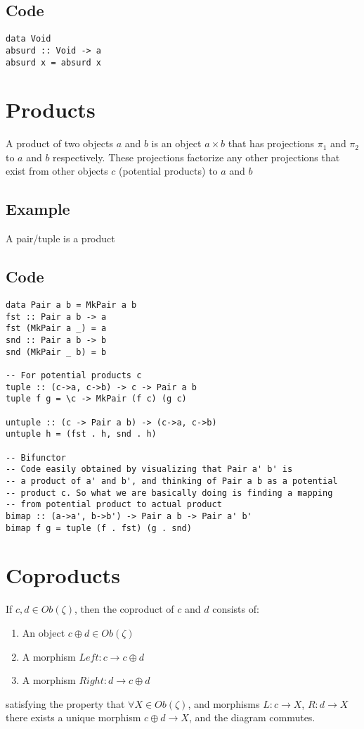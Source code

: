 \documentclass[11pt]{article}
\begin{document}
\subsection{Code}
\label{sec:org9ea2a9b}
\begin{verbatim}
data Void
absurd :: Void -> a
absurd x = absurd x
\end{verbatim}

\section{Products}
\label{sec:org99e3acd}
A product of two objects \(a\) and \(b\) is an object \(a \times b\) that has projections \(\pi_1\) and
\(\pi_2\) to \(a\) and \(b\) respectively. These projections factorize any other
projections that exist from other objects \(c\) (potential products) to \(a\) and \(b\)

\subsection{Example}
\label{sec:org639505e}
A pair/tuple is a product

\subsection{Code}
\label{sec:org5e9fdb6}
\begin{verbatim}
data Pair a b = MkPair a b
fst :: Pair a b -> a
fst (MkPair a _) = a
snd :: Pair a b -> b
snd (MkPair _ b) = b

-- For potential products c
tuple :: (c->a, c->b) -> c -> Pair a b
tuple f g = \c -> MkPair (f c) (g c)

untuple :: (c -> Pair a b) -> (c->a, c->b)
untuple h = (fst . h, snd . h)

-- Bifunctor
-- Code easily obtained by visualizing that Pair a' b' is
-- a product of a' and b', and thinking of Pair a b as a potential
-- product c. So what we are basically doing is finding a mapping
-- from potential product to actual product
bimap :: (a->a', b->b') -> Pair a b -> Pair a' b'
bimap f g = tuple (f . fst) (g . snd)
\end{verbatim}

\section{Coproducts}
\label{sec:orga821aab}
If \(c,d \in Ob(\zeta)\), then the coproduct of \(c\) and \(d\) consists of:
\begin{enumerate}
\item An object \(c \oplus d \in Ob(\zeta)\)
\item A morphism \(Left: c \to c \oplus d\)
\item A morphism \(Right: d \to c \oplus d\)
\end{enumerate}
satisfying the property that \(\forall X \in Ob(\zeta)\), and morphisms \(L: c \to
X\), \(R: d \to X\) there exists a unique morphism \(c \oplus d \to X\), and the
diagram commutes.
\end{document}
